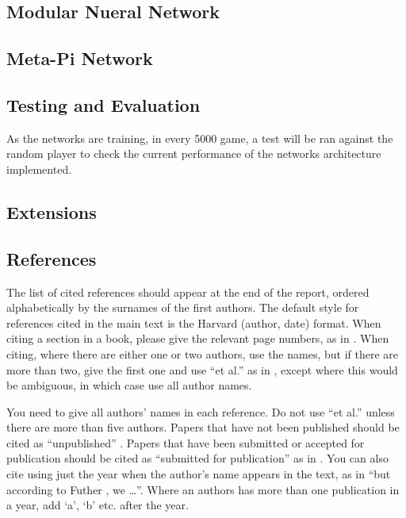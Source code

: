 \documentclass[12pt,a4paper]{article}
\begin{document}
\subsection{Modular Nueral Network}
\subsection{Meta-Pi Network}


\subsection{Testing and Evaluation}
As the networks are training, in every 5000 game, a test will be ran against the random player to check the current performance of the networks architecture implemented. 

\subsection{Extensions}


\subsection{References}

The list of cited references should appear at the end of the report, ordered alphabetically by the surnames of the first authors.  The default style for references cited in the main text is the  Harvard (author, date) format.  When citing a section in a book, please give the relevant page numbers, as in \cite[p293]{budgen}.  When citing, where there are either one or two authors, use the names, but if there are more than two, give the first one and use ``et al.'' as in  , except where this would be ambiguous, in which case use all author names.

You need to give all authors' names in each reference.  Do not use ``et al.'' unless there are more than five authors.  Papers that have not been published should be cited as ``unpublished'' \cite{euther}.  Papers that have been submitted or accepted for publication should be cited as ``submitted for publication'' as in \cite{futher} .  You can also cite using just the year when the author's name appears in the text, as in ``but according to Futher \citeyear{futher}, we \dots''.  Where an authors has more than one publication in a year, add `a', `b' etc. after the year.





\end{document}
